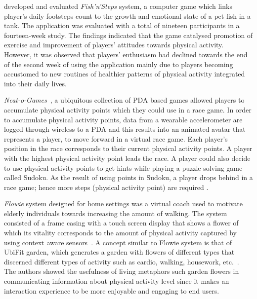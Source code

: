 \cite{lin2006:fish} developed and evaluated \emph{{Fish'n'Steps}} system, a computer game which links player's daily footsteps count to the growth and emotional state of a pet fish in a tank. The application was evaluated with a total of nineteen participants in a fourteen-week study. The findings indicated that the game catalysed promotion of exercise and improvement of players’ attitudes towards physical activity. However, it was observed that players' enthusiasm had declined towards the end of the second week of using the application mainly due to players becoming accustomed to new routines of healthier patterns of physical activity integrated into their daily lives.
  
\emph{{Neat-o-Games}}~\citep{fujiki2008neat}, a ubiquitous collection of PDA based games allowed players to accumulate physical activity points which they could use in a race game. In order to accumulate physical activity points, data from a wearable accelerometer are logged through wireless to a PDA and this results into an animated avatar that represents a player, to move forward in a virtual race game. Each player's position in the race corresponds to their current physical activity points. A player with the highest physical activity point leads the race. A player could also decide to use physical activity points to get hints while playing a puzzle solving game called Sudoku. As the result of using points in Sudoku, a player drops behind in a race game; hence more steps (physical activity point) are required .

\emph{Flowie} system designed for home settings was a virtual coach used to motivate elderly individuals towards increasing the amount of walking. The system consisted of a frame casing with a touch screen display that shows a flower of which its vitality corresponds to the amount of physical activity captured by using context aware sensors~\citep{albaina2009flowie}. A concept similar to Flowie system is that of UbiFit garden, which generates a garden with flowers of different types that discerned different types of activity such as cardio, walking, housework, etc.~\citep{klasnja2009:using}. The authors showed the usefulness of living metaphors
such garden flowers in communicating information about physical activity level since it makes an interaction experience to be more enjoyable and engaging to end users.

